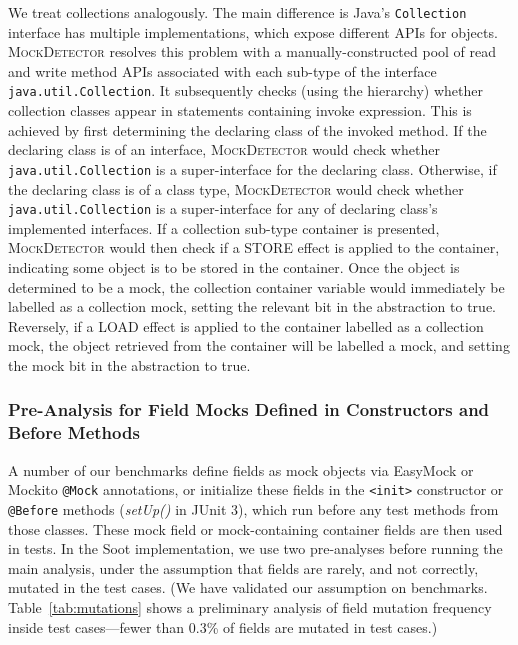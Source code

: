 We treat collections analogously. The main difference is Java's \texttt{Collection} interface has multiple implementations, which expose different APIs for objects. \textsc{MockDetector} resolves this problem with a manually-constructed pool of read and write method APIs associated with each sub-type of the interface \texttt{java.util.Collection}. It subsequently checks (using the hierarchy) whether collection classes appear in statements containing invoke expression. This is achieved by first determining the declaring class of the invoked method. If the declaring class is of an interface, \textsc{MockDetector} would check whether \texttt{java.util.Collection} is a super-interface for the declaring class. Otherwise, if the declaring class is of a class type, \textsc{MockDetector} would check whether \texttt{java.util.Collection} is a super-interface for any of declaring class's implemented interfaces. If a collection sub-type container is presented, \textsc{MockDetector} would then check if a STORE effect is applied to the container, indicating some object is to be stored in the container. Once the object is determined to be a mock, the collection container variable would immediately be labelled as a collection mock, setting the relevant bit in the abstraction to true. Reversely, if a LOAD effect is applied to the container labelled as a collection mock, the object retrieved from the container will be labelled a mock, and setting the mock bit in the abstraction to true.

\subsubsection{Pre-Analysis for Field Mocks Defined in Constructors and Before Methods}
\label{subsubsec:pre-analysis} A number of our benchmarks define fields as mock objects via EasyMock or Mockito \texttt{@Mock} annotations, or initialize these fields in the \texttt{<init>} constructor or \texttt{@Before} methods (\textit{setUp()} in JUnit 3), which run before any test methods from those classes. These mock field or mock-containing container fields are then used in tests. In the Soot implementation, we use two pre-analyses before running the main analysis, under the assumption that fields are rarely, and not correctly, mutated in the test cases. (We have validated our assumption on benchmarks. Table~\ref{tab:mutations} shows a preliminary analysis of field mutation frequency inside test cases---fewer than 0.3\% of fields are mutated in test cases.)  

